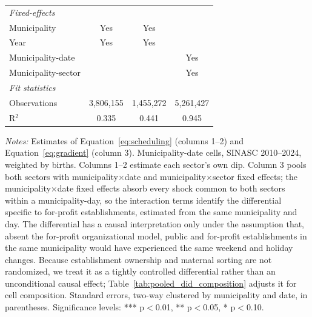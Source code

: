 \begin{table}[H]
{\begin{tabular}{lccc}
      \emph{Fixed-effects}\\
      Municipality                       & Yes               & Yes                & \\  
      Year                               & Yes               & Yes                & \\  
      Municipality-date                  &                   &                    & Yes\\  
      Municipality-sector                &                   &                    & Yes\\  
      \midrule
      \emph{Fit statistics}\\
      Observations                       & 3,806,155         & 1,455,272          & 5,261,427\\  
      R$^2$                              & 0.335             & 0.441              & 0.945\\  
\bottomrule
   \end{tabular}
}
   
   \par \raggedright 
   \footnotesize\textit{Notes:} Estimates of Equation~\eqref{eq:scheduling} (columns 1--2) and Equation~\eqref{eq:gradient} (column 3). Municipality-date cells, SINASC 2010--2024, weighted by births. Columns 1--2 estimate each sector's own dip. Column 3 pools both sectors with municipality$\times$date and municipality$\times$sector fixed effects; the municipality$\times$date fixed effects absorb every shock common to both sectors within a municipality-day, so the interaction terms identify the differential specific to for-profit establishments, estimated from the same municipality and day. The differential has a causal interpretation only under the assumption that, absent the for-profit organizational model, public and for-profit establishments in the same municipality would have experienced the same weekend and holiday changes. Because establishment ownership and maternal sorting are not randomized, we treat it as a tightly controlled differential rather than an unconditional causal effect; Table~\ref{tab:pooled_did_composition} adjusts it for cell composition. Standard errors, two-way clustered by municipality and date, in parentheses. \footnotesize Significance levels: *** p$<$0.01, ** p$<$0.05, * p$<$0.10.
\end{table}


